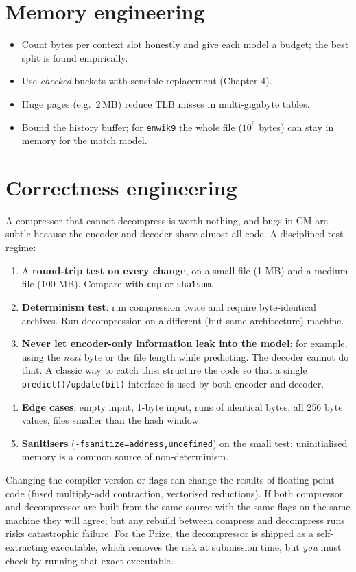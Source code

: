 \documentclass[11pt,a4paper,openany]{book}
\newcommand{\code}[1]{\texttt{#1}}
\theoremstyle{definition}
\theoremstyle{remark}
\begin{document}
\section{Memory engineering}

\begin{itemize}
\item Count bytes per context slot honestly and give each model a budget; the best split is found empirically.
\item Use \emph{checked} buckets with sensible replacement (Chapter 4).
\item Huge pages (e.g.\ 2\,MB) reduce TLB misses in multi-gigabyte tables.
\item Bound the history buffer; for \code{enwik9} the whole file ($10^9$ bytes) can stay in memory for the match model.
\end{itemize}

\section{Correctness engineering}

A compressor that cannot decompress is worth nothing, and bugs in CM are subtle because the encoder and decoder share almost all code. A disciplined test regime:
\begin{enumerate}
\item A \textbf{round-trip test on every change}, on a small file (1 MB) and a medium file (100 MB). Compare with \code{cmp} or \code{sha1sum}.
\item \textbf{Determinism test}: run compression twice and require byte-identical archives. Run decompression on a different (but same-architecture) machine.
\item \textbf{Never let encoder-only information leak into the model}: for example, using the \emph{next} byte or the file length while predicting. The decoder cannot do that. A classic way to catch this: structure the code so that a single \code{predict()/update(bit)} interface is used by both encoder and decoder.
\item \textbf{Edge cases}: empty input, 1-byte input, runs of identical bytes, all 256 byte values, files smaller than the hash window.
\item \textbf{Sanitisers} (\code{-fsanitize=address,undefined}) on the small test; uninitialised memory is a common source of non-determinism.
\end{enumerate}

\begin{pitfall}
Changing the compiler version or flags can change the results of floating-point code (fused multiply-add contraction, vectorised reductions). If both compressor and decompressor are built from the same source with the same flags on the same machine they will agree; but any rebuild between compress and decompress runs risks catastrophic failure. For the Prize, the decompressor is shipped as a self-extracting executable, which removes the risk at submission time, but \emph{you} must check by running that exact executable.
\end{pitfall}
\end{document}
